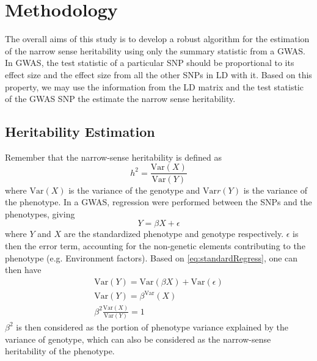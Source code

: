 	\section{Methodology}	
		The overall aims of this study is to develop a robust algorithm for the estimation of the narrow sense heritability using only the summary statistic from a \gls{GWAS}.
		In \gls{GWAS}, the test statistic of a particular \gls{SNP} should be proportional to its effect size and the effect size from all the other \glspl{SNP} in \gls{LD} with it.
		Based on this property, we may use the information from the \gls{LD} matrix and the test statistic of the \gls{GWAS} \gls{SNP} the estimate the narrow sense heritability.
		
		
		\subsection{Heritability Estimation}
			Remember that the narrow-sense heritability is defined as 
			$$
				h^2 = \frac{\mathrm{Var}(X)}{\mathrm{Var}(Y)}
			$$
			where $\mathrm{Var}(X)$ is the variance of the genotype and $\mathrm{Var}r(Y)$ is the variance of the phenotype.
			In a \gls{GWAS}, regression were performed between the \glspl{SNP} and the phenotypes, giving
			\begin{equation}
				Y=\beta X+\epsilon
				\label{eq:standardRegress}
			\end{equation}
			where $Y$ and $X$ are the standardized phenotype and genotype respectively. 
			$\epsilon$ is then the error term, accounting for the non-genetic elements contributing to the phenotype (e.g. Environment factors).
			Based on \cref{eq:standardRegress}, one can then have
			\begin{align}
				\mathrm{Var}(Y) = \mathrm{Var}(\beta X)+ \mathrm{Var}(\epsilon) \nonumber\\
				\mathrm{Var}(Y) = \beta^\mathrm{Var}(X) \nonumber\\
				\beta^2\frac{\mathrm{Var}(X)}{\mathrm{Var}(Y)}= 1
				\label{eq:betaHeri}
			\end{align}
			$\beta^2$ is then considered as the portion of phenotype variance explained by the variance of genotype, which can also be considered as the narrow-sense heritability of the phenotype.
					
